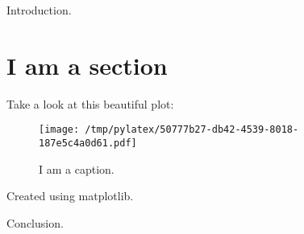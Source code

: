 \documentclass{article}%
\begin{document}
%
\normalsize%
Introduction.%
\section*{I am a section}%
Take a look at this beautiful plot:%


\begin{figure}[htbp]%
\centering%
\texttt{[image: /tmp/pylatex/50777b27-db42-4539-8018-187e5c4a0d61.pdf]}%
\caption{I am a caption.}%
\end{figure}

%
Created using matplotlib.

%
Conclusion.%
\end{document}
